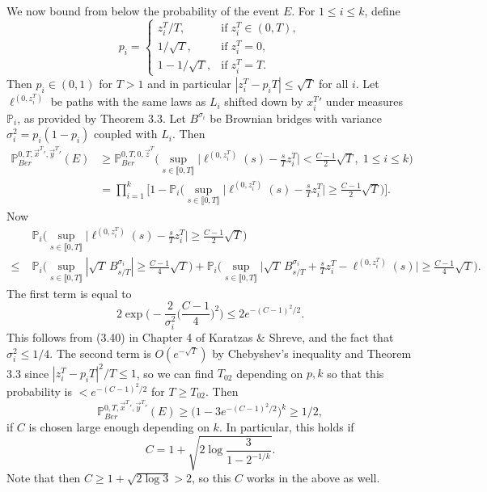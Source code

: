 \documentclass[12pt]{article}
\begin{document}
	We now bound from below the probability of the event $E$. For $1\leq i\leq k$, define
	\[
	p_i = \begin{cases}
	z_i^T/T, & \mathrm{if}\;z_i^T \in (0,T),\\
	1/\sqrt{T}, & \mathrm{if}\;z_i^T = 0,\\
	1 - 1/\sqrt{T}, & \mathrm{if}\;z_i^T = T.
	\end{cases}
	\] 
	Then $p_i\in(0,1)$ for $T>1$ and in particular $|z_i^T - p_i T|\leq \sqrt{T}$ for all $i$. Let $\ell^{(0,z^T_i)}$ be paths with the same laws as $L_i$ shifted down by $x_i^T{}'$ under measures $\mathbb{P}_i$, as provided by Theorem 3.3. Let $B^{\sigma_i}$ be Brownian bridges with variance $\sigma_i^2 = p_i(1-p_i)$ coupled with $L_i$. Then
	\begin{align*}
	\mathbb{P}^{0,T,\vec{x}^T{}',\vec{y}^T{}'}_{Ber}(E) &\geq \mathbb{P}^{0,T,0,\vec{z}^T}_{Ber} \Big( \sup_{s\in\llbracket 0, T\rrbracket} \Big|\ell^{(0,z_i^T)}(s) - \frac{s}{T}z_i^T\Big| < \frac{C-1}{2}\sqrt{T},\; 1\leq i\leq k \Big)\\
	&= \prod_{i=1}^k \Big[ 1 - \mathbb{P}_i \Big( \sup_{s\in\llbracket 0, T\rrbracket} \Big|\ell^{(0,z_i^T)}(s) - \frac{s}{T}z_i^T\Big| \geq \frac{C-1}{2}\sqrt{T} \Big) \Big].
	\end{align*}
	Now
	\begin{align*}
	&\mathbb{P}_i \Big( \sup_{s\in\llbracket 0, T\rrbracket} \Big|\ell^{(0,z_i^T)}(s) - \frac{s}{T}z_i^T\Big| \geq \frac{C-1}{2}\sqrt{T} \Big)\\
	\leq \; & \mathbb{P}_i \Big( \sup_{s\in\llbracket 0, T\rrbracket} |\sqrt{T}\,B^{\sigma_i}_{s/T}| \geq \frac{C-1}{4}\sqrt{T}\Big) + \mathbb{P}_i \Big( \sup_{s\in\llbracket 0, T\rrbracket} \Big|\sqrt{T}\,B^{\sigma_i}_{s/T} + \frac{s}{T}z_i^T - \ell^{(0,z_i^T)}(s)\Big| \geq \frac{C-1}{4}\sqrt{T} \Big).
	\end{align*}
	The first term is equal to
	\[
	2\exp\Big( - \frac{2}{\sigma_i^2}\Big(\frac{C-1}{4}\Big)^2\Big) \leq 2e^{-(C-1)^2/2}.
	\]
	This follows from (3.40) in Chapter 4 of Karatzas \& Shreve, and the fact that $\sigma_i^2 \leq 1/4$. The second term is $O(e^{-\sqrt{T}})$ by Chebyshev's inequality and Theorem 3.3 since $|z_i^T-p_iT|^2/T \leq 1$, so we can find $T_{02}$ depending on $p,k$ so that this probability is $< e^{-(C-1)^2/2}$ for $T\geq T_{02}$. Then
	\[
	\mathbb{P}^{0,T,\vec{x}^T{}',\vec{y}^T{}'}_{Ber}(E) \geq \big(1 - 3e^{-(C-1)^2/2}\big)^k \geq 1/2,
	\]
	if $C$ is chosen large enough depending on $k$. In particular, this holds if
	\[
	C = 1 + \sqrt{2\log\frac{3}{1-2^{-1/k}}}.
	\] 
	Note that then $ C \geq 1 + \sqrt{2\log 3} > 2$, so this $C$ works in the above as well. 
	
\end{document}
